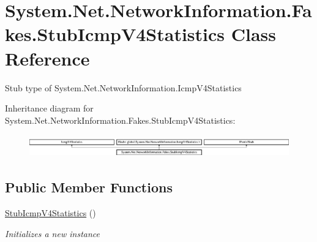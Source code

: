 \hypertarget{class_system_1_1_net_1_1_network_information_1_1_fakes_1_1_stub_icmp_v4_statistics}{\section{System.\-Net.\-Network\-Information.\-Fakes.\-Stub\-Icmp\-V4\-Statistics Class Reference}
\label{class_system_1_1_net_1_1_network_information_1_1_fakes_1_1_stub_icmp_v4_statistics}
}


Stub type of System.\-Net.\-Network\-Information.\-Icmp\-V4\-Statistics 


Inheritance diagram for System.\-Net.\-Network\-Information.\-Fakes.\-Stub\-Icmp\-V4\-Statistics\-:\begin{figure}[H]
\begin{center}
\leavevmode
\includegraphics[height=0.982456cm]{class_system_1_1_net_1_1_network_information_1_1_fakes_1_1_stub_icmp_v4_statistics}
\end{center}
\end{figure}
\subsection*{Public Member Functions}
\begin{DoxyCompactItemize}
\item 
\hyperlink{class_system_1_1_net_1_1_network_information_1_1_fakes_1_1_stub_icmp_v4_statistics_a3057d4c5710e6754aae7c3c1beef4bde}{Stub\-Icmp\-V4\-Statistics} ()
\begin{DoxyCompactList}\small\item\em Initializes a new instance\end{DoxyCompactList}\end{DoxyCompactItemize}
